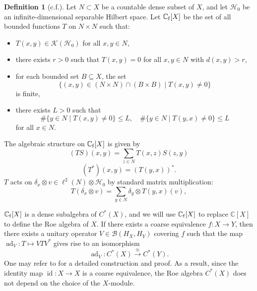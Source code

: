 \documentclass{article}
\theoremstyle{plain}
\theoremstyle{definition}
\newtheorem{definition}[theorem]{Definition}
\theoremstyle{remark}
\DeclareMathOperator{\id}{id}
\def\B{\mathcal B}
\def\K{\mathcal K}
\def\H{\mathcal H}
\begin{document}
	\begin{definition}[c.f.\cite{yu2000coarse}]
		Let $N\subset X$ be a countable dense subset of $X$, and let $\H_0$ be an infinite-dimensional separable Hilbert space. Let $\mathbb C_{\rm f}[X]$ be the set of all bounded functions $T$ on $N\times N$ such that:
		\begin{itemize}
			\item[(1)] $T(x,y)\in \K(\H_0)$ for all $x,y\in N$,
			\item[(2)] there exists $r>0$ such that $T(x,y)=0$ for all $x,y\in N$ with $d(x,y)>r$,
			\item[(3)] for each bounded set $B\subseteq X$, the set
			$$\{(x,y)\in (N\times N)\cap (B\times B)\mid T(x,y)\ne0\}$$
			is finite,
			\item[(4)] there exists $L>0$ such that
			$$\#\{y\in N\mid T(x,y)\ne0\}\leq L,\quad\#\{y\in N\mid T(y,x)\ne0\}\leq L$$
			for all $x\in N$.
		\end{itemize}
		The algebraic structure on $\mathbb C_{\rm f}[X]$ is given by
		$$(TS)(x,y)=\sum_{z\in N}T(x,z)S(z,y)$$
		$$(T^*)(x,y)=(T(y,x))^*.$$
		$T$ acts on $\delta_x\otimes v\in\ell^{2}(N)\otimes\H_0$ by standard matrix multiplication:
		$$T(\delta_x\otimes v)=\sum_{y\in N}\delta_y\otimes T(y,x)(v),$$
	\end{definition}
	$\mathbb C_{\rm f}[X]$ is a dense subalgebra of $C^*(X)$, and we will use $\mathbb C_{\rm f}[X]$ to replace $\mathbb C[X]$ to define the Roe algebra of $X$. If there exists a coarse equivalence $f:X\to Y$, then there exists a unitary operator $V\in\B(H_X,H_Y)$ covering $f$ such that the map $\operatorname{ad}_V: T\mapsto VTV^*$ gives rise to an isomorphism 
	$$\operatorname{ad}_V:C^*(X)\xrightarrow{\cong} C^*(Y).$$
	One may refer to \cite[Chapter 4]{yu2000coarse} for a detailed construction and proof. As a result, since the identity map $\id: X\to X$ is a coarse equivalence, the Roe algebra $C^*(X)$ does not depend on the choice of the $X$-module. 
	
\end{document}
